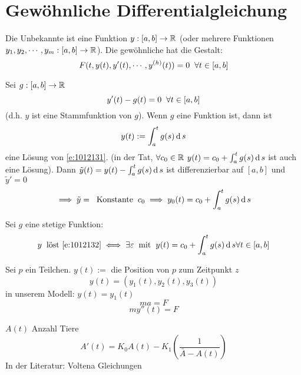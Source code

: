 \section{Gewöhnliche Differentialgleichung}
Die Unbekannte ist eine Funktion $y:[a,b]\to\mathbb{R}$ (oder mehrere Funktionen $y_1,y_2,\cdots,y_m:[a,b]\to\mathbb{R}$). Die gewöhnliche hat die Gestalt:
\begin{equation}
  \label{e:1012131}
  F(t,y(t),y'(t),\cdots,y^{(h)}(t))=0\hspace{2mm}\forall t\in[a,b]
\end{equation}
\begin{Bsp}
  Sei $g:[a,b]\to\mathbb{R}$
  \begin{equation}
    \label{e:1012132}
    y'(t)-g(t)=0\hspace{2mm}\forall t\in [a,b]
  \end{equation}
  (d.h. $y$ ist eine Stammfunktion von $g$). Wenn $g$ eine Funktion ist, dann ist
  \[y(t):=\int_a^tg(s)\operatorname{d} s\]
  eine Lösung von \ref{e:1012131}. (in der Tat, $\forall c_0\in\mathbb{R}$ $y(t)=c_0+\int_a^tg(s)\operatorname{d} s$ ist auch eine Lösung). Dann $\tilde y(t)=y(t)-\int_a^tg(s)\operatorname{d} s$ ist differenzierbar auf $[a,b]$ und $\tilde y'=0$ 
  \[\implies \tilde y= \hspace{2mm}\text{Konstante}\hspace{2mm} c_0 \implies y_0(t)=c_0+\int_a^tg(s)\operatorname{d} s\]
\end{Bsp}
\begin{Sat}
  Sei $g$ eine stetige Funktion:
  \[y \hspace{2mm}\text{löst \ref{e:1012132}} \iff \exists \varepsilon\hspace{2mm}\text{mit}\hspace{2mm} y(t)=c_0+\int_a^tg(s)\operatorname{d} s\forall t\in [a,b]\]
\end{Sat}
\begin{Bsp}
  Sei $p$ ein Teilchen. $y(t):=$ die Position von $p$ zum Zeitpunkt $z$
  \[y(t)=(y_1(t), y_2(t), y_3(t))\]
  in unserem Modell: $y(t)=y_1(t)$
  \[ma=F\]
  \[my''(t)=F\]
\end{Bsp}
\begin{Bsp}
  $A(t)$ Anzahl Tiere
  \[A'(t)=K_0A(t)-K_1\left( \frac{1}{\bar A - A(t)} \right)\]
  In der Literatur: Voltena Gleichungen
\end{Bsp}
